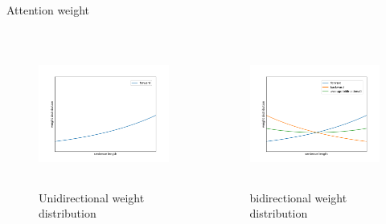\documentclass[aspectratio=169]{beamer}
\begin{document}
    \begin{frame}{Attention weight}
      \begin{columns}
      \begin{column}[t]{0.5\textwidth}
        \begin{figure}
        \includegraphics[width=6.4cm,height=4.8cm]{forward.png}
        \caption{Unidirectional weight distribution}
        \end{figure}
      \end{column}

      \begin{column}[t]{0.5\textwidth}
        \begin{figure}
        \includegraphics[width=6.4cm,height=4.8cm]{bidirectional.png}
        \caption{bidirectional weight distribution}
        \end{figure}
      \end{column}

      \end{columns}
    \end{frame}
\end{document}
